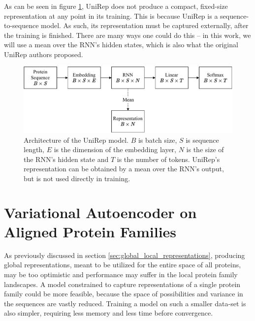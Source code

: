 As can be seen in figure \ref{fig:unirep_architecture}, UniRep does not produce a compact, fixed-size representation at any point in its training. This is because UniRep is a sequence-to-sequence model. As such, its representation must be captured externally, after the training is finished. There are many ways one could do this -- in this work, we will use a mean over the RNN's hidden states, which is also what the original UniRep authors proposed.

\begin{figure}[H]
    \centering
    \includegraphics[width = \linewidth]{report/figures/unirep.pdf}
    \caption{Architecture of the UniRep model. $B$ is batch size, $S$ is sequence length, $E$ is the dimension of the embedding layer, $N$ is the size of the RNN's hidden state and $T$ is the number of tokens. UniRep's representation can be obtained by a mean over the RNN's output, but is not used directly in training.}
    \label{fig:unirep_architecture}
\end{figure}

\section{Variational Autoencoder on Aligned Protein Families}
\label{sec:variational_autoencoder_model}

As previously discussed in section \ref{sec:global_local_representations}, producing global representations, meant to be utilized for the entire space of all proteins, may be too optimistic and performance may suffer in the local protein family landscapes. A model constrained to capture representations of a single protein family could be more feasible, because the space of possibilities and variance in the sequences are vastly reduced. Training a model on such a smaller data-set is also simpler, requiring less memory and less time before convergence.


